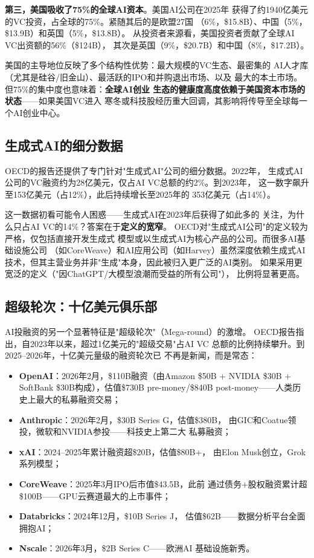 \textbf{第三，美国吸收了75\%的全球AI资本}。美国AI公司在2025年
获得了约1940亿美元的VC投资，占全球的75\%。紧随其后的是欧盟27国
（6\%，\$15.8B）、中国（5\%，\$13.9B）和英国（5\%，\$13.8B）。
从投资者来源看，美国投资者贡献了全球AI VC出资额的56\%（\$124B），
其次是英国（9\%，\$20.7B）和中国（8\%，\$17.2B）。

美国的主导地位反映了多个结构性优势：最大规模的VC生态、最密集的
AI人才库（尤其是硅谷/旧金山）、最活跃的IPO和并购退出市场、以及
最大的本土市场。但75\%的集中度也意味着：\textbf{全球AI创业
生态的健康度高度依赖于美国资本市场的状态}——如果美国VC进入
寒冬或科技股经历重大回调，其影响将传导至全球每一个AI创业中心。

\subsection{生成式AI的细分数据}

OECD的报告还提供了专门针对"生成式AI"公司的细分数据。2022年，
生成式AI公司的VC融资约为28亿美元，仅占AI VC总额的约2\%。到2023年，
这一数字飙升至153亿美元（占12\%），此后持续增长至2025年的
353亿美元（占14\%）。

这一数据初看可能令人困惑——生成式AI在2023年后获得了如此多的
关注，为什么只占AI VC的14\%？答案在于\textbf{定义的宽窄}。
OECD对"生成式AI公司"的定义较为严格，仅包括直接开发生成式
模型或以生成式AI为核心产品的公司。而很多AI基础设施公司
（如CoreWeave）和AI应用公司（如Harvey）虽然深度依赖生成式AI
技术，但其主营业务并非"生成"本身，因此被归入更广泛的AI类别。
如果采用更宽泛的定义（"因ChatGPT/大模型浪潮而受益的所有公司"），
比例将显著更高。

\subsection{超级轮次：十亿美元俱乐部}

AI投融资的另一个显著特征是"超级轮次"（Mega-round）的激增。
OECD报告指出，自2023年以来，超过1亿美元的"超级交易"占AI VC
总额的比例持续攀升。到2025--2026年，十亿美元量级的融资轮次已
不再是新闻，而是常态：

\begin{itemize}
  \item \textbf{OpenAI}：2026年2月，\$110B融资（由Amazon \$50B +
    NVIDIA \$30B + SoftBank \$30B构成），估值\$730B pre-money/\$840B
    post-money——人类历史上最大的私募融资交易；
  \item \textbf{Anthropic}：2026年2月，\$30B Series G，估值\$380B，
    由GIC和Coatue领投，微软和NVIDIA参投——科技史上第二大
    私募融资；
  \item \textbf{xAI}：2024--2025年累计融资超\$20B，估值\$80B+，
    由Elon Musk创立，Grok系列模型；
  \item \textbf{CoreWeave}：2025年3月IPO后市值\$43.5B，此前
    通过债务+股权融资累计超\$100B——GPU云赛道最大的上市事件；
  \item \textbf{Databricks}：2024年12月，\$10B Series J，
    估值\$62B——数据分析平台全面拥抱AI；
  \item \textbf{Nscale}：2026年3月，\$2B Series C——欧洲AI
    基础设施新秀。
\end{itemize}


